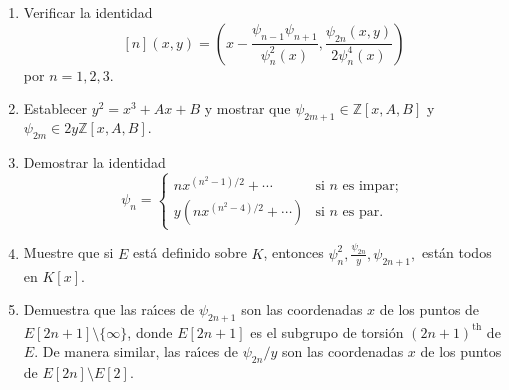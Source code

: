 \documentclass[a4paper,10pt]{article}
\begin{document}
\begin{enumerate}
 \item Verificar la identidad
$$[n](x,y)=\left(x-{\frac {\psi _{{n-1}}\psi _{{n+1}}}{\psi _{{n}}^{{2}}(x)}},{\frac {\psi _{{2n}}(x,y)}{2\psi _{{n}}^{{4}}(x)}}\right)$$
por $n=1,2,3$.
\item Establecer $y^{2}=x^{3}+Ax+B$ y mostrar que $\psi _{{2m+1}}\in {\mathbb {Z}}[x,A,B]$ y $\psi _{{2m}}\in 2y{\mathbb {Z}}[x,A,B].$
\item Demostrar la identidad
$$\psi_{n}=\begin{cases}
            nx^{(n^2-1)/2}+\cdots&\text{si $n$ es impar};\\
            y(nx^{(n^2-4)/2}+\cdots)&\text{si $n$ es par}.
           \end{cases}$$
\item Muestre que si $E$ est\'a definido sobre $K$, entonces 
$\psi _{{n}}^{2} , {\frac {\psi _{{2n}}}{y}},\psi _{{2n+1}},$ est\'an todos en $K[x]$.
\item Demuestra que las ra\'{\i}ces de $\psi _{{2n+1}}$ son las coordenadas $x$ de los puntos de $ E[2n+1]\setminus \{\infty\}$, donde $E[2n +1]$ es el subgrupo de torsi\'on $(2n+1)^{{{\text{th}}}}$ de $E$. De manera similar, las ra\'{\i}ces de $ \psi _{{2n}}/y$ son las coordenadas $x$ de los puntos de $E[2n]\setminus E[2]$.
\end{enumerate}
\end{document}
